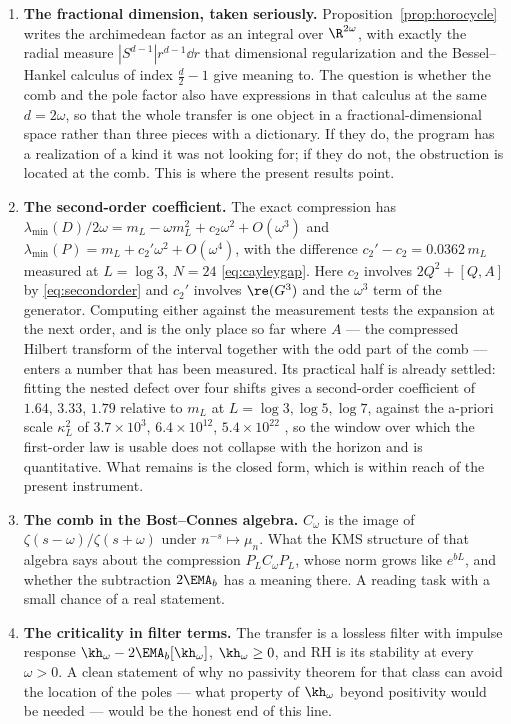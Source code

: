\begin{enumerate}
\item \textbf{The fractional dimension, taken seriously.}
Proposition~\ref{prop:horocycle} writes the archimedean factor as an integral
over $\R^{2\omega}$, with exactly the radial measure
$|S^{d-1}|r^{d-1}\dd r$ that dimensional regularization and the Bessel--Hankel
calculus of index $\frac d2-1$ give meaning to. The question is whether the comb
and the pole factor also have expressions in that calculus at the same
$d=2\omega$, so that the whole transfer is one object in a
fractional-dimensional space rather than three pieces with a dictionary. If they
do, the program has a realization of a kind it was not looking for; if they do
not, the obstruction is located at the comb. This is where the present results
point.
\item \textbf{The second-order coefficient.} The exact compression has
$\lambda_{\min}(D)/2\omega=m_L-\omega m_L^2+c_2\omega^2+O(\omega^3)$ and
$\lambda_{\min}(P)=m_L+c_2'\omega^2+O(\omega^4)$, with the difference
$c_2'-c_2=0.0362\,m_L$ measured at $L=\log3$, $N=24$ \eqref{eq:cayleygap}. Here
$c_2$ involves $2Q^2+[Q,A]$ by \eqref{eq:secondorder} and $c_2'$ involves
$\re(G^3)$ and the $\omega^3$ term of the generator. Computing either against
the measurement tests the expansion at the next order, and is the only place so
far where $A$ --- the compressed Hilbert transform of the interval together with
the odd part of the comb --- enters a number that has been measured. Its
practical half is already settled: fitting the nested defect over four shifts
gives a second-order coefficient of $1.64$, $3.33$, $1.79$ relative to $m_L$ at
$L=\log3,\log5,\log7$, against the a-priori scale $\kappa_L^2$ of
$3.7\times10^{3}$, $6.4\times10^{12}$, $5.4\times10^{22}$ \cite{HalfDimension},
so the window over which the first-order law is usable does not collapse with the
horizon and \cite[Remark~7.7]{WilsonLines} is quantitative. What remains is the
closed form, which is within reach of the present instrument.
\item \textbf{The comb in the Bost--Connes algebra.} $C_\omega$ is the image of
$\zeta(s-\omega)/\zeta(s+\omega)$ under $n^{-s}\mapsto\mu_n$. What the KMS
structure of that algebra says about the compression $P_LC_\omega P_L$, whose
norm grows like $e^{bL}$, and whether the subtraction $2\EMA_b$ has a meaning
there. A reading task with a small chance of a real statement.
\item \textbf{The criticality in filter terms.} The transfer is a lossless
filter with impulse response $\kh_\omega-2\EMA_b[\kh_\omega]$, $\kh_\omega\geq0$,
and RH is its stability at every $\omega>0$. A clean statement of why no
passivity theorem for that class can avoid the location of the poles --- what
property of $\kh_\omega$ beyond positivity would be needed --- would be the
honest end of this line.
\end{enumerate}

